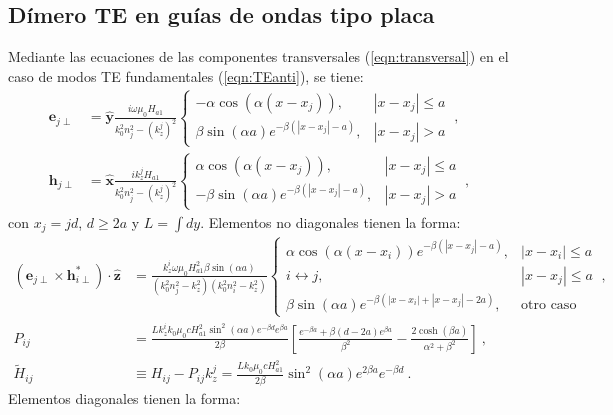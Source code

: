 \subsection{Dímero TE en guías de ondas tipo placa}
Mediante las ecuaciones de las componentes transversales (\ref{eqn:transversal}) en el caso de modos TE fundamentales (\ref{eqn:TEanti}), se tiene: 
\begin{align*}
	\textbf{e}_{j\perp} &= \hat{\textbf{y}}\frac{i\omega\mu_0 H_{a1}}{k_0^2n_j^2 - (k_z^j)^2}\left\{ \begin{matrix}
-\alpha \cos(\alpha (x-x_j)), &|x-x_j|\le a
\\
\beta\sin(\alpha a) e^{-\beta(|x-x_j|-a)}, &|x-x_j| > a
\end{matrix}\right. \ ,
\\
\textbf{h}_{j\perp} &= \hat{\textbf{x}}\frac{ik_z^j H_{a1}}{k_0^2n_j^2 - (k_z^j)^2}\left\{ \begin{matrix}
\alpha \cos(\alpha (x-x_j)), &|x-x_j|\le a
\\
-\beta\sin(\alpha a) e^{-\beta(|x-x_j|-a)}, &|x-x_j| > a
\end{matrix}\right. \ ,
\end{align*} con $x_j=jd$, $d\ge 2a$ y $L=\int dy$. Elementos no diagonales tienen la forma:
\begin{align*}
	\left(\textbf{e}_{j\perp}\times\textbf{h}_{i\perp}^*\right)\cdot \hat{\textbf{z}}
	&=
	\frac{k_z^i \omega \mu_0 H_{a1}^2 \beta\sin(\alpha a)}{(k_0^2n_j^2 - k_z^2)(k_0^2n_i^2 - k_z^2)}
	\left\{
	\begin{matrix}
		 \alpha\cos(\alpha(x-x_i))e^{-\beta(|x-x_j|-a)}, & |x-x_i| \le a
		\\
		i \leftrightarrow j, & |x-x_j| \le a
		\\
		\beta \sin(\alpha a)e^{-\beta (|x-x_i|+|x-x_j|-2a)}, & \text{otro caso}
	\end{matrix}
	\right. \ ,
\\
	P_{ij} &= \frac{L k_z^i k_0  \mu_0 c H_{a1}^2 \sin^2(\alpha a)e^{-\beta d}e^{\beta a}}{2\beta} \left[\frac{e^{-\beta a} + \beta (d-2a)e^{\beta a}}{\beta^2} - \frac{2\cosh(\beta a)}{\alpha^2+\beta^2} \right] \ ,
\\
	\tilde{H}_{ij} &\equiv H_{ij} - P_{ij} k_z^j = \frac{L k_0    \mu_0 c H_{a1}^2 }{2 \beta }  \sin^2(\alpha a)e^{2\beta a} e^{-\beta d} \ .
\end{align*}
Elementos diagonales tienen la forma:
